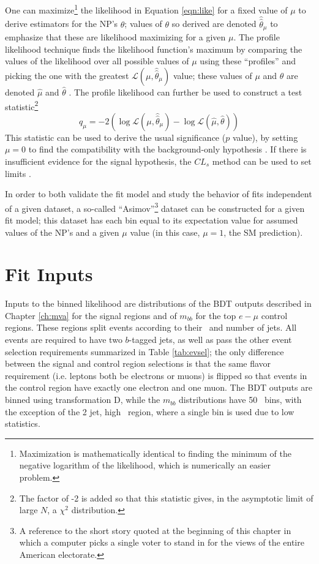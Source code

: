 One can maximize\footnote{Maximization is mathematically identical to finding the minimum of the negative logarithm of the likelihood, which is numerically an easier problem.} the likelihood in Equation \ref{eqn:like} for a fixed value of $\mu$ to derive estimators for the NP's $\theta$; values of $\theta$ so derived are denoted $\hat{\hat{\theta}}_{\mu}$ to emphasize that these are likelihood maximizing for a given $\mu$.  The profile likelihood technique finds the likelihood function's maximum by comparing the values of the likelihood over all possible values of $\mu$ using these ``profiles'' and picking the one with the greatest $\mathcal{L}\left(\mu,\hat{\hat{\theta}}_{\mu}\right)$ value; these values of $\mu$ and $\theta$ are denoted $\hat{\mu}$ and $\hat{\theta}$ .  The profile likelihood can further be used to construct a test statistic\footnote{The factor of -2 is added so that this statistic gives, in the asymptotic limit of large $N$, a $\chi^2$ distribution.}
\begin{equation}
\label{eqn:teststat}
q_{\mu}=-2\left(\log\mathcal{L}\left(\mu,\hat{\hat{\theta}}_{\mu}\right)-\log\mathcal{L}\left(\hat{\mu},\hat{\theta}\right)\right)
\end{equation}
This statistic can be used to derive the usual significance ($p$ value), by setting $\mu=0$ to find the compatibility with the background-only hypothesis \cite{asimov}.  If there is insufficient evidence for the signal hypothesis, the $CL_s$ method can be used to set limits \cite{cls_read}.

In order to both validate the fit model and study the behavior of fits independent of a given dataset, a so-called ``Asimov''\footnote{A reference to the short story quoted at the beginning of this chapter in which a computer picks a single voter to stand in for the views of the entire American electorate.} dataset can be constructed for a given fit model; this dataset has each bin equal to its expectation value for assumed values of the NP's and a given $\mu$ value (in this case, $\mu=1$, the SM prediction).

\section{Fit Inputs}
\label{ssec:inputs}
Inputs to the binned likelihood are distributions of the BDT outputs described in Chapter \ref{ch:mva} for the signal regions and of $m_{bb}$ for the top $e-\mu$ control regions.  These regions split events according to their \ptv\, and number of jets.  All events are required to have two $b$-tagged jets, as well as pass the other event selection requirements summarized in Table \ref{tab:evsel}; the only difference between the signal and control region selections is that the same flavor requirement (i.e. leptons both be electrons or muons) is flipped so that events in the control region have exactly one electron and one muon.  The BDT outputs are binned using transformation D, while the $m_{bb}$ distributions have 50 \GeV\, bins, with the exception of the 2 jet, high \ptv\, region, where a single bin is used due to low statistics.

